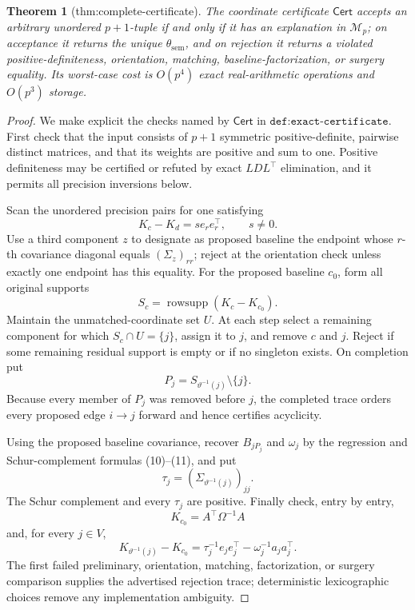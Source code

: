\documentclass{article}
\newtheorem{theorem}{Theorem}
\begin{document}
\begin{theorem}[thm:complete-certificate]\label{thm:complete-certificate}
The coordinate certificate \(\mathsf{Cert}\) accepts an arbitrary unordered \(p+1\)-tuple if and only if it has an explanation in \(\mathcal M_p\); on acceptance it returns the unique \(\theta_{\mathrm{sem}}\), and on rejection it returns a violated positive-definiteness, orientation, matching, baseline-factorization, or surgery equality. Its worst-case cost is \(O(p^4)\) exact real-arithmetic operations and \(O(p^3)\) storage.
\end{theorem}
\begin{proof}
We make explicit the checks named by \(\mathsf{Cert}\) in
\(\texttt{def:exact-certificate}\).  First check that the input consists
of \(p+1\) symmetric positive-definite, pairwise distinct matrices, and
that its weights are positive and sum to one.  Positive definiteness may
be certified or refuted by exact \(LDL^{\top}\) elimination, and it permits
all precision inversions below.

Scan the unordered precision pairs for one satisfying
\[
 K_c-K_d=s e_re_r^{\top},\qquad s\neq0.                            \tag{13}
\]
Use a third component \(z\) to designate as proposed baseline the endpoint
whose \(r\)-th covariance diagonal equals \((\Sigma_z)_{rr}\); reject at
the orientation check unless exactly one endpoint has this equality.
For the proposed baseline \(c_0\), form all original supports
\[
 S_c=\operatorname{rowsupp}(K_c-K_{c_0}).
\]
Maintain the unmatched-coordinate set \(U\).  At each step select a
remaining component for which \(S_c\cap U=\{j\}\), assign it to \(j\),
and remove \(c\) and \(j\).  Reject if some remaining residual support is
empty or if no singleton exists.  On completion put
\[
 P_j=S_{\vartheta^{-1}(j)}\setminus\{j\}.                           \tag{14}
\]
Because every member of \(P_j\) was removed before \(j\), the completed
trace orders every proposed edge \(i\to j\) forward and hence certifies
acyclicity.

Using the proposed baseline covariance, recover \(B_{jP_j}\) and
\(\omega_j\) by the regression and Schur-complement formulas (10)--(11),
and put
\[
 \tau_j=(\Sigma_{\vartheta^{-1}(j)})_{jj}.
\]
The Schur complement and every \(\tau_j\) are positive.  Finally check,
entry by entry,
\[
 K_{c_0}=A^{\top}\Omega^{-1}A                                    \tag{15}
\]
and, for every \(j\in V\),
\[
 K_{\vartheta^{-1}(j)}-K_{c_0}
 =\tau_j^{-1}e_je_j^{\top}-\omega_j^{-1}a_ja_j^{\top}.              \tag{16}
\]
The first failed preliminary, orientation, matching, factorization, or
surgery comparison supplies the advertised rejection trace; deterministic
lexicographic choices remove any implementation ambiguity.


\end{proof}
\end{document}

